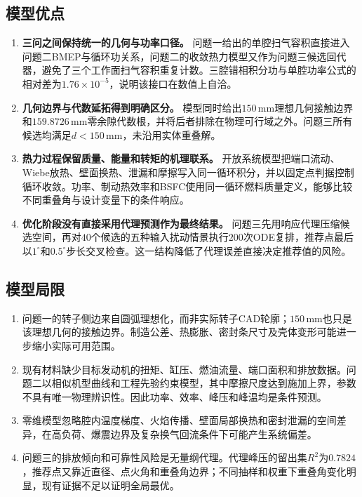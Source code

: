 \documentclass[withoutpreface,bwprint]{cumcmthesis}
\begin{document}
\subsection{模型优点}

\begin{enumerate}[label=(\arabic*),leftmargin=2.8em]
 \item \textbf{三问之间保持统一的几何与功率口径。} 问题一给出的单腔扫气容积直接进入问题二BMEP与循环功关系，问题二的收敛热力模型又作为问题三候选回代器，避免了三个工作面扫气容积重复计数。三腔错相积分功与单腔功率公式的相对差为$1.76\times10^{-5}$，说明该接口在数值上自洽。
 \item \textbf{几何边界与代数延拓得到明确区分。} 模型同时给出$150\,\mathrm{mm}$理想几何接触边界和$159.8726\,\mathrm{mm}$零余隙代数根，并将后者排除在物理可行域之外。问题三所有候选均满足$d<150\,\mathrm{mm}$，未沿用实体重叠解。
 \item \textbf{热力过程保留质量、能量和转矩的机理联系。} 开放系统模型把端口流动、Wiebe放热、壁面换热、泄漏和摩擦写入同一循环积分，并以固定点判据控制循环收敛。功率、制动热效率和BSFC使用同一循环燃料质量定义，能够比较不同重叠角与设计变量下的条件响应。
 \item \textbf{优化阶段没有直接采用代理预测作为最终结果。} 问题三先用响应代理压缩候选空间，再对$40$个候选的五种输入扰动情景执行$200$次ODE复排，推荐点最后以$1^\circ$和$0.5^\circ$步长交叉检查。这一结构降低了代理误差直接决定推荐值的风险。
\end{enumerate}

\subsection{模型局限}

\begin{enumerate}[label=(\arabic*),leftmargin=2.8em]
 \item 问题一的转子侧边来自圆弧理想化，而非实际转子CAD轮廓；$150\,\mathrm{mm}$也只是该理想几何的接触边界。制造公差、热膨胀、密封条尺寸及壳体变形可能进一步缩小实际可用范围。
 \item 现有材料缺少目标发动机的扭矩、缸压、燃油流量、端口面积和排放数据。问题二以相似机型曲线和工程先验约束模型，其中摩擦尺度达到施加上界，参数不具有唯一物理辨识性。因此功率、效率、峰压和峰温均是条件预测。
 \item 零维模型忽略腔内温度梯度、火焰传播、壁面局部换热和密封泄漏的空间差异，在高负荷、爆震边界及复杂换气回流条件下可能产生系统偏差。
 \item 问题三的排放倾向和可靠性风险是无量纲代理。代理峰压的留出集$R^2$为$0.7824$，推荐点又靠近直径、点火角和重叠角边界；不同抽样和权重下重叠角变化明显，现有证据不足以证明全局最优。
\end{enumerate}
\end{document}
